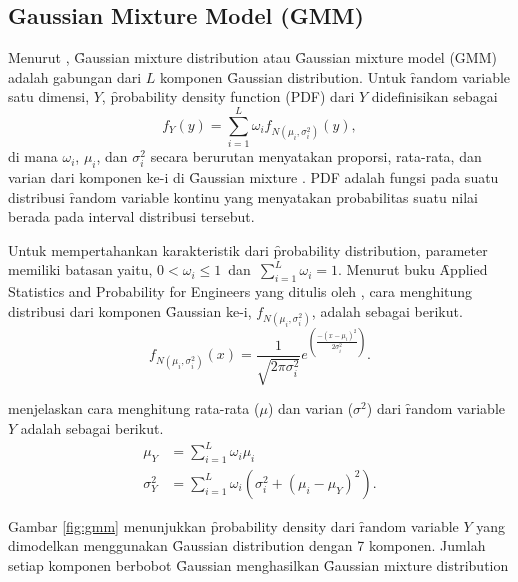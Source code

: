  \subsection{Gaussian Mixture Model (GMM)}
  Menurut \cite{6235282}, \f{Gaussian mixture distribution} atau \f{Gaussian mixture model} (GMM) adalah gabungan dari $L$ komponen \f{Gaussian distribution}. Untuk \f{random variable} satu dimensi, $Y$, \f{probability density function (PDF)} dari $Y$ didefinisikan sebagai
  \begin{equation}
    f_Y(y) = \sum_{i=1}^{L}{\omega_i f_{N(\mu_i,\sigma^2_i)}(y)},
  \end{equation}
  di mana $\omega_i$, $\mu_i$, dan $\sigma^2_i$ secara berurutan menyatakan proporsi, rata-rata, dan varian dari komponen ke-i di \f{Gaussian mixture} \citep{4643623}. PDF adalah fungsi pada suatu distribusi \f{random variable} kontinu yang menyatakan probabilitas suatu nilai berada pada interval distribusi tersebut.

  Untuk mempertahankan karakteristik dari \f{probability distribution}, parameter memiliki batasan yaitu, $0<\omega_i\leq1$~dan~$\sum_{i=1}^{L}{\omega_i=1}$. Menurut buku \f{Applied Statistics and Probability for Engineers} yang ditulis oleh \cite{montgomery2013applied}, cara menghitung distribusi dari komponen \f{Gaussian} ke-i, $f_{N(\mu_i,\sigma^2_i)}$, adalah sebagai berikut.
  \begin{equation}
    f_{N(\mu_i,\sigma^2_i)}(x) = \frac{1}{\sqrt{2\pi\sigma^2_i}} e^{(\frac{-(x-\mu_i)^2}{2\sigma^2_i})}.
  \end{equation}

  \cite{5089549} menjelaskan cara menghitung rata-rata ($\mu$) dan varian ($\sigma^2$) dari \f{random variable} $Y$ adalah sebagai berikut.
  \begin{align}
    \mu_Y      &= \sum_{i=1}^{L}{\omega_i\mu_i}\\
    \sigma^2_Y &= \sum_{i=1}^{L}{\omega_i(\sigma^2_i+(\mu_i-\mu_Y)^2)}.
  \end{align}

  Gambar \ref{fig:gmm} menunjukkan \f{probability density} dari \f{random variable} $Y$ yang dimodelkan menggunakan \f{Gaussian distribution} dengan 7 komponen. Jumlah setiap komponen berbobot \f{Gaussian} menghasilkan \f{Gaussian mixture distribution}

